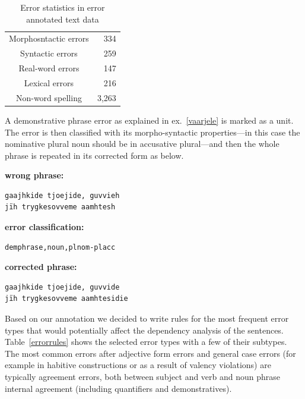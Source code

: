 \documentclass[free]{flammie}
\begin{document}
\begin{table}[]
    \centering
    \begin{tabular}{cr}
         Morphosntactic errors & 334 \\
         Syntactic errors & 259 \\
         Real-word errors & 147 \\
         Lexical errors & 216 \\
         \midrule
         Non-word spelling & 3,263 \\
    \end{tabular}
    \caption{Error statistics in error annotated text data\label{tab:my_label}}
\end{table}

A demonstrative phrase error as explained in ex.~\ref{vaarjele} is marked as a
unit. The error is then classified with its morpho-syntactic properties---in
this case the nominative plural noun should be in accusative plural---and then
the whole phrase is repeated in its corrected form as below.


\textbf{wrong phrase:}
   \begin{verbatim}
gaajhkide tjoejide, guvvieh
jïh trygkesovveme aamhtesh
   \end{verbatim}
\textbf{error classification:}
   \begin{verbatim}
demphrase,noun,plnom-placc
   \end{verbatim}
\textbf{corrected phrase:}
   \begin{verbatim}
gaajhkide tjoejide, guvvide
jïh trygkesovveme aamhtesidie
   \end{verbatim}

Based on our annotation we decided to write rules for the most frequent error
types that would potentially affect the dependency analysis of the sentences.
Table~\ref{errorrules} shows the selected error types with a few of their
subtypes. The most common errors after adjective form errors and general case
errors (for example in habitive constructions or as a result of valency
violations) are typically agreement errors, both between subject and verb and
noun phrase internal agreement (including quantifiers and demonstratives).
\end{document}
